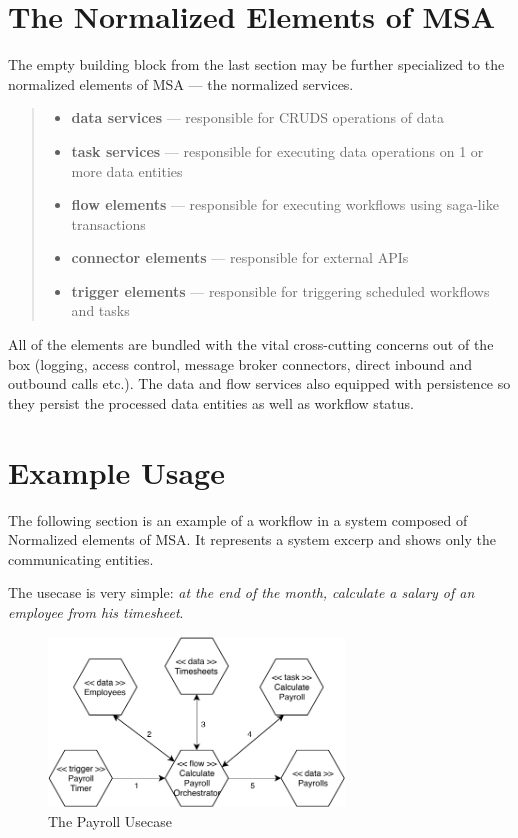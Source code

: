 \documentclass[thesis=M,english,hidelinks]{FITthesis}[2012/10/20]
\begin{document}
\section{The Normalized Elements of MSA}
\label{sec:msa-nor-elem}

The empty building block from the last section may be further specialized to the normalized elements of MSA --- the normalized services.

\begin{quote}
    \begin{itemize}
        \item \textbf{data services} --- responsible for \acrfull{CRUDS} operations of data
        \item \textbf{task services} --- responsible for executing data operations on 1 or more data entities
        \item \textbf{flow elements} --- responsible for executing workflows using saga-like transactions
        \item \textbf{connector elements} --- responsible for external APIs
        \item \textbf{trigger elements} --- responsible for triggering scheduled workflows and tasks
    \end{itemize}
\end{quote}

All of the elements are bundled with the vital cross-cutting concerns out of the box (logging, access control, message broker connectors, direct inbound and outbound calls etc.). The data and flow services also equipped with persistence so they persist the processed data entities as well as workflow status.


\section{Example Usage}

The following section is an example of a workflow in a system composed of Normalized elements of \acrshort{MSA}. It represents a system excerp and shows only the communicating entities.

The usecase is very simple: \textit{at the end of the month, calculate a salary of an employee from his timesheet}. 

\begin{figure} [!ht]
  \centering
    \includegraphics[width=0.7\textwidth]{images/sample_usage.pdf}
    \caption{The Payroll Usecase}
    \label{fig:proposed-building-block}
\end{figure}
\end{document}
